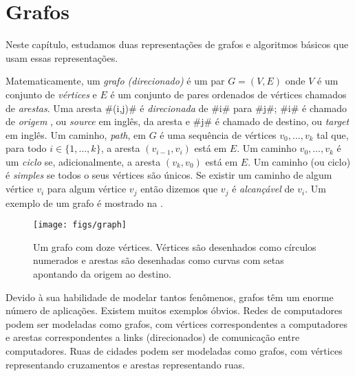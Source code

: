 \chapter{Grafos}


Neste capítulo, estudamos duas representações de grafos e algoritmos
básicos que usam essas representações.

Matematicamente, um \emph{grafo (direcionado)}
%
%
é um par
$G=(V,E)$ onde
$V$ é um conjunto de \emph{vértices}
%
e $E$ é um conjunto de pares ordenados de vértices chamados de 
\emph{arestas}.
%
Uma aresta #(i,j)# é \emph{direcionada}
%
de #i# para #j#;  #i# é chamado de \emph{origem}
, ou \emph{source} em inglês, da aresta e #j#
é chamado de destino, ou \emph{target} em inglês.
  Um caminho, \emph{path},%
 em $G$ é uma sequência de vértices 
$v_0,\ldots,v_k$ tal que, para todo $i\in\{1,\ldots,k\}$,
a aresta $(v_{i-1},v_{i})$ está em $E$.  Um caminho $v_0,\ldots,v_k$ é um
\emph{ciclo}
%
se, adicionalmente, a aresta
 $(v_k,v_0)$ está em $E$.  Um caminho (ou ciclo) é 
\emph{simples}
%
se todos o seus vértices são únicos. Se existir um caminho de algum vértice
$v_i$ para algum vértice $v_j$ então dizemos que 
$v_j$ é \emph{alcançável}
 de $v_i$.  Um exemplo de um grafo é mostrado na 
.

\begin{figure}
  \begin{center}
    \texttt{[image: figs/graph]}
  \end{center}
  \caption{Um grafo com doze vértices. Vértices são desenhados como círculos numerados e arestas são desenhadas como curvas com setas apontando da origem ao destino.}
\end{figure}

Devido à sua habilidade de modelar tantos fenômenos, grafos têm 
um enorme número de aplicações. Existem muitos exemplos óbvios. 
Redes de computadores podem ser modeladas como grafos, com vértices 
correspondentes a computadores e arestas correspondentes a links 
(direcionados) de comunicação entre computadores.
Ruas de cidades podem ser modeladas como grafos, com vértices 
representando cruzamentos e arestas representando ruas.

